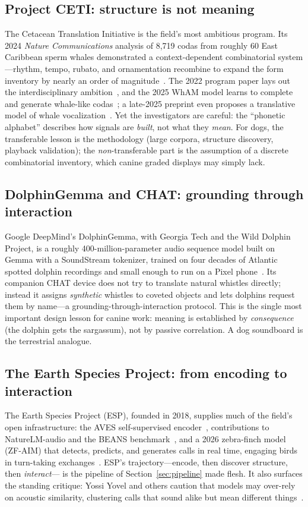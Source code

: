 \subsection{Project CETI: structure is not meaning}
The Cetacean Translation Initiative is the field's most ambitious program.
Its 2024 \emph{Nature Communications} analysis of 8{,}719 codas from roughly
60 East Caribbean sperm whales demonstrated a context-dependent combinatorial
system---rhythm, tempo, rubato, and ornamentation recombine to expand the
form inventory by nearly an order of magnitude~\cite{sharma2024whale}. The
2022 program paper lays out the interdisciplinary
ambition~\cite{andreas2022ceti}, and the 2025 WhAM model learns to complete
and generate whale-like codas~\cite{wham2025}; a late-2025 preprint even
proposes a translative model of whale
vocalization~\cite{arxiv2025whaletrans}. Yet the investigators are careful:
the ``phonetic alphabet'' describes how signals are \emph{built}, not what
they \emph{mean}. For dogs, the transferable lesson is the methodology
(large corpora, structure discovery, playback validation); the
\emph{non}-transferable part is the assumption of a discrete combinatorial
inventory, which canine graded displays may simply lack.

\subsection{DolphinGemma and CHAT: grounding through interaction}
Google DeepMind's DolphinGemma, with Georgia Tech and the Wild Dolphin
Project, is a roughly 400-million-parameter audio sequence model built on
Gemma with a SoundStream tokenizer, trained on four decades of Atlantic
spotted dolphin recordings and small enough to run on a Pixel
phone~\cite{google2025dolphingemma}. Its companion CHAT device does not try
to translate natural whistles directly; instead it assigns \emph{synthetic}
whistles to coveted objects and lets dolphins request them by name---a
grounding-through-interaction protocol. This is the single most important
design lesson for canine work: meaning is established by \emph{consequence}
(the dolphin gets the sargassum), not by passive correlation. A dog
soundboard is the terrestrial analogue.

\subsection{The Earth Species Project: from encoding to interaction}
The Earth Species Project (ESP), founded in 2018, supplies much of the
field's open infrastructure: the AVES self-supervised
encoder~\cite{hagiwara2023aves}, contributions to NatureLM-audio and the
BEANS benchmark~\cite{robinson2024naturelm,hagiwara2023beans}, and a 2026
zebra-finch model (ZF-AIM) that detects, predicts, and generates calls in
real time, engaging birds in turn-taking exchanges~\cite{esp2026finch}.
ESP's trajectory---encode, then discover structure, then \emph{interact}---%
is the pipeline of Section~\ref{sec:pipeline} made flesh. It also surfaces
the standing critique: Yossi Yovel and others caution that models may
over-rely on acoustic similarity, clustering calls that sound alike but mean
different things~\cite{yovel2025critique}.

